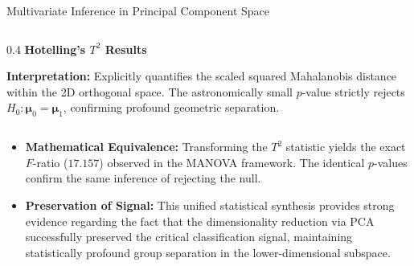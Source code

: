 \documentclass[8pt, aspectratio=169]{beamer}
\begin{document}
\begin{frame}{Multivariate Inference in Principal Component Space}
\begin{columns}[T]
        \begin{column}{0.4\textwidth}
            \centering
            \textbf{Hotelling's $T^2$ Results}
            \vspace{0.1cm}
            \begin{table}
            \end{table}
            \vspace{0.1cm}
            \justifying
            \scriptsize{\textbf{Interpretation:} Explicitly quantifies the scaled squared Mahalanobis distance within the 2D orthogonal space. The astronomically small $p$-value strictly rejects $H_0: \boldsymbol{\mu}_0 = \boldsymbol{\mu}_1$, confirming profound geometric separation.}
        \end{column}
    \end{columns}

    \vspace{0.4cm}
    \begin{itemize}
        \item \textbf{Mathematical Equivalence:} Transforming the $T^2$ statistic yields the exact $F$-ratio ($17.157$) observed in the MANOVA framework. The identical $p$-values confirm the same inference of rejecting the null.
        \item \textbf{Preservation of Signal:} This unified statistical synthesis provides strong evidence regarding the fact that the dimensionality reduction via PCA successfully preserved the critical classification signal, maintaining statistically profound group separation in the lower-dimensional subspace.
    \end{itemize}
\end{frame}
\end{document}
